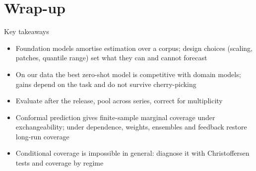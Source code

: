 \section{Wrap-up}

\begin{frame}{Key takeaways}
\itemsize{\small}
\begin{itemize}
    \item Foundation models amortise estimation over a corpus; design choices (scaling, patches, quantile range) set what they can and cannot forecast
    \item On our data the best zero-shot model is competitive with domain models; gains depend on the task and do not survive cherry-picking
    \item Evaluate after the release, pool across series, correct for multiplicity
    \item Conformal prediction gives finite-sample marginal coverage under exchangeability; under dependence, weights, ensembles and feedback restore long-run coverage
    \item Conditional coverage is impossible in general: diagnose it with Christoffersen tests and coverage by regime
\end{itemize}
\end{frame}

